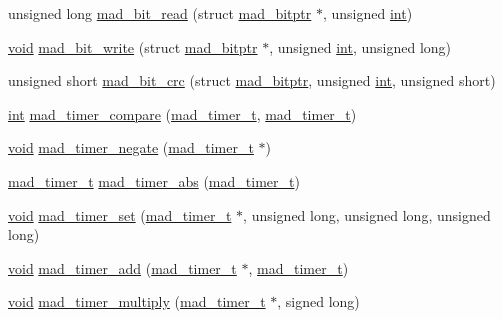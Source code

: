 \begin{DoxyCompactItemize}
unsigned long \hyperlink{mac_2config_2i386_2lib-src_2libmad_2mad_8h_a691bcc7fa9b862661689da7744c1c0b3}{mad\+\_\+bit\+\_\+read} (struct \hyperlink{structmad__bitptr}{mad\+\_\+bitptr} $\ast$, unsigned \hyperlink{xmltok_8h_a5a0d4a5641ce434f1d23533f2b2e6653}{int})
\item 
\hyperlink{sound_8c_ae35f5844602719cf66324f4de2a658b3}{void} \hyperlink{mac_2config_2i386_2lib-src_2libmad_2mad_8h_a489b2b30e963c86f152a25a8036547c6}{mad\+\_\+bit\+\_\+write} (struct \hyperlink{structmad__bitptr}{mad\+\_\+bitptr} $\ast$, unsigned \hyperlink{xmltok_8h_a5a0d4a5641ce434f1d23533f2b2e6653}{int}, unsigned long)
\item 
unsigned short \hyperlink{mac_2config_2i386_2lib-src_2libmad_2mad_8h_a3adcbec8bcd4cecfb5ba5ae2d271af2a}{mad\+\_\+bit\+\_\+crc} (struct \hyperlink{structmad__bitptr}{mad\+\_\+bitptr}, unsigned \hyperlink{xmltok_8h_a5a0d4a5641ce434f1d23533f2b2e6653}{int}, unsigned short)
\item 
\hyperlink{xmltok_8h_a5a0d4a5641ce434f1d23533f2b2e6653}{int} \hyperlink{mac_2config_2i386_2lib-src_2libmad_2mad_8h_af3b4aae92a345192ac505a06d078a4f3}{mad\+\_\+timer\+\_\+compare} (\hyperlink{structmad__timer__t}{mad\+\_\+timer\+\_\+t}, \hyperlink{structmad__timer__t}{mad\+\_\+timer\+\_\+t})
\item 
\hyperlink{sound_8c_ae35f5844602719cf66324f4de2a658b3}{void} \hyperlink{mac_2config_2i386_2lib-src_2libmad_2mad_8h_aeb441a3c0136757d7fcea625fc4787ed}{mad\+\_\+timer\+\_\+negate} (\hyperlink{structmad__timer__t}{mad\+\_\+timer\+\_\+t} $\ast$)
\item 
\hyperlink{structmad__timer__t}{mad\+\_\+timer\+\_\+t} \hyperlink{mac_2config_2i386_2lib-src_2libmad_2mad_8h_a834ec927737bc74efc6ab49ce7b6d767}{mad\+\_\+timer\+\_\+abs} (\hyperlink{structmad__timer__t}{mad\+\_\+timer\+\_\+t})
\item 
\hyperlink{sound_8c_ae35f5844602719cf66324f4de2a658b3}{void} \hyperlink{mac_2config_2i386_2lib-src_2libmad_2mad_8h_a27bfecee054e0d86ce736cdb129a6531}{mad\+\_\+timer\+\_\+set} (\hyperlink{structmad__timer__t}{mad\+\_\+timer\+\_\+t} $\ast$, unsigned long, unsigned long, unsigned long)
\item 
\hyperlink{sound_8c_ae35f5844602719cf66324f4de2a658b3}{void} \hyperlink{mac_2config_2i386_2lib-src_2libmad_2mad_8h_a15f3a8890f8949bd9ab972b2bb53a747}{mad\+\_\+timer\+\_\+add} (\hyperlink{structmad__timer__t}{mad\+\_\+timer\+\_\+t} $\ast$, \hyperlink{structmad__timer__t}{mad\+\_\+timer\+\_\+t})
\item 
\hyperlink{sound_8c_ae35f5844602719cf66324f4de2a658b3}{void} \hyperlink{mac_2config_2i386_2lib-src_2libmad_2mad_8h_a8949ad8ca853994283663d9e6fec06e9}{mad\+\_\+timer\+\_\+multiply} (\hyperlink{structmad__timer__t}{mad\+\_\+timer\+\_\+t} $\ast$, signed long)

\end{DoxyCompactItemize}
